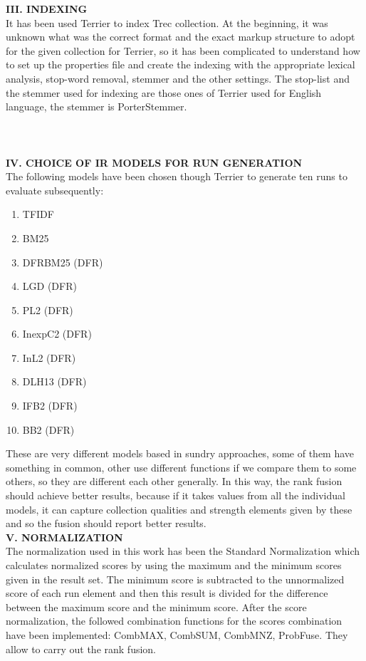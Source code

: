 \documentclass[12pt,journal]{IEEEtran}
\begin{document}
\textbf{III. INDEXING} \\
It has been used Terrier to index Trec collection. 
At the beginning, it was unknown what was the correct format and the exact markup structure to adopt for the given collection for Terrier, so it has been complicated to understand how to set up the properties file and create the indexing with the appropriate lexical analysis, stop-word removal, stemmer and the other settings. The stop-list and the stemmer used for indexing are those ones of Terrier used for English language, the stemmer is PorterStemmer. \\ \\ \\ \\

\textbf{IV. CHOICE OF IR MODELS FOR RUN GENERATION} \\
The following models have been chosen though Terrier to generate ten runs to evaluate subsequently: 
\begin{enumerate}
\item TFIDF
\item BM25
\item DFRBM25 (DFR)
\item LGD (DFR)
\item PL2 (DFR)
\item InexpC2 (DFR)
\item InL2 (DFR)
\item DLH13 (DFR)
\item IFB2 (DFR)
\item BB2 (DFR)
\end{enumerate} 
These are very different models based in sundry approaches, some of them have something in common, other use different functions if we compare them to some others, so they are different each other generally. In this way, the rank fusion should achieve better results, because if it takes values from all the individual models, it can capture collection qualities and strength elements given by these and so the fusion should report better results. \\

\textbf{V. NORMALIZATION} \\
The normalization used in this work has been the Standard Normalization which calculates normalized scores by using the maximum and the minimum scores given in the result set. 
The minimum score is subtracted to the unnormalized score of each run element and then this result is divided for the difference between the maximum score and the minimum score.
After the score normalization, the followed combination functions for the scores combination have been implemented: CombMAX, CombSUM, CombMNZ, ProbFuse.
They allow to carry out the rank fusion. \\
\end{document}
